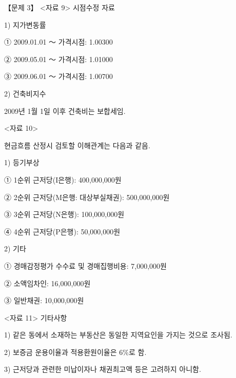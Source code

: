 \begin{longquestion}{【문제 3】}
<자료 9> 시점수정 자료 \par
1) 지가변동률 \par
① 2009.01.01 ～ 가격시점: 1.00300 \par
② 2009.05.01 ～ 가격시점: 1.01000 \par
③ 2009.06.01 ～ 가격시점: 1.00700 \par
2) 건축비지수 \par
2009년 1월 1일 이후 건축비는 보합세임. \par
<자료 10> \par
현금흐름 산정시 검토할 이해관계는 다음과 같음. \par
1) 등기부상 \par
① 1순위 근저당(I은행): 400,000,000원 \par
② 2순위 근저당(M은행: 대상부실채권): 500,000,000원 \par
③ 3순위 근저당(N은행): 100,000,000원 \par
④ 4순위 근저당(P은행): 50,000,000원 \par
2) 기타 \par
① 경매감정평가 수수료 및 경매집행비용: 7,000,000원 \par
② 소액임차인: 16,000,000원 \par
③ 일반채권: 10,000,000원 \par
<자료 11> 기타사항 \par
1) 같은 동에서 소재하는 부동산은 동일한 지역요인을 가지는 것으로 조사됨. \par
2) 보증금 운용이율과 적용환원이율은 6\%로 함. \par
3) 근저당과 관련한 미납이자나 채권최고액 등은 고려하지 아니함. \par
\end{longquestion}
